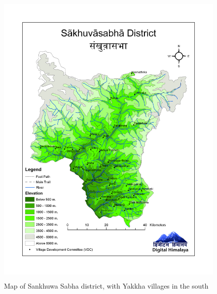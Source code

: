 \begin{figure}
\centering
\includegraphics[height=15cm]{figures/district_sankhuwasabha_everything.png}
\caption{Map of Sankhuwa Sabha district, with Yakkha villages in the south \citep{Joshi_Nepal_maps}}\label{map-sank}
\end{figure}

